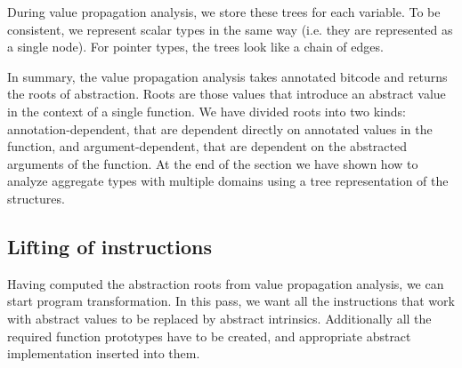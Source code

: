 \begin{example}
\begin{center}
\begin{minipage}[t]{.47\textwidth}
\end{minipage}
\end{center}
\end{example}

During value propagation analysis, we store these trees for each variable.
To be consistent, we represent scalar types in the same way (i.e. they are
represented as a single node). For pointer types, the trees look like a chain of
 edges.

\begin{summary}
In summary, the value propagation analysis takes annotated \LLVM bitcode and
returns the roots of abstraction. Roots are those \LLVM values that introduce an
abstract value in the context of a single function. We have divided roots into two
kinds: annotation-dependent, that are dependent directly on annotated values
in the function, and argument-dependent, that are dependent
on the abstracted arguments of the function. At the end of the section we
have shown how to analyze aggregate types with multiple domains using a tree
representation of the structures.
\end{summary}

\subsection{Lifting of instructions}
Having computed the abstraction roots from value propagation analysis, we can
start program transformation. In this \LLVM pass, we want all the instructions
that work with abstract values to be replaced by abstract intrinsics.
Additionally all the required function prototypes have to be created, and
appropriate abstract implementation inserted into them.

